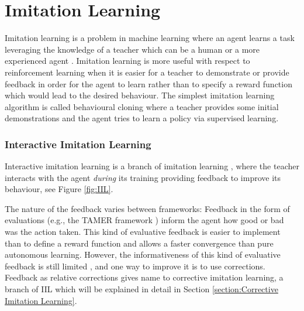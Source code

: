 \section{Imitation Learning}
\label{section:Imitation Learning}

Imitation learning is a problem in machine learning where an agent learns a task leveraging the knowledge of a teacher which can be a human or a more experienced agent \cite{Imitation-Learning-definition-torabi:2019}. Imitation learning is more useful with respect to reinforcement learning when it is easier for a teacher to demonstrate or provide feedback in order for the agent to learn rather than to specify a reward function which would lead to the desired behaviour. The simplest imitation learning algorithm is called behavioural cloning where a teacher provides some initial demonstrations and the agent tries to learn a policy via supervised learning.




\subsubsection{Interactive Imitation Learning}
\label{subsubsection:Interactive-Imitation-Learning}

Interactive imitation learning is a branch of imitation learning \cite{lazydagger:2021}, where the teacher interacts with the agent \textit{during} its training providing feedback to improve its behaviour, see Figure \ref{fig:IIL}. 






 The nature of the feedback varies between frameworks: Feedback in the form of evaluations (e.g., the TAMER framework \cite{TAMER-Knox-Stone:2009}) inform the agent how good or bad was the action taken. This kind of evaluative feedback is easier to implement than to define a reward function and allows a faster convergence than pure autonomous learning. 
However, the informativeness of this kind of evaluative feedback is still limited \cite{types-feedback-najar:2020}, and one way to improve it is to use corrections. Feedback as relative corrections \cite{Relative-corrections-Celemin:2019} gives name to corrective imitation learning, a branch of IIL which will be explained in detail in Section \ref{section:Corrective Imitation Learning}. 




